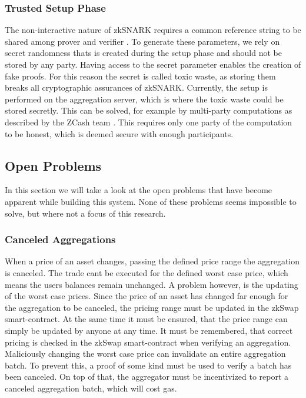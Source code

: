 \documentclass[../../thesis.tex]{subfiles}
\begin{document}
\subsubsection{Trusted Setup Phase} \label{setup}
The non-interactive nature of zkSNARK requires a common reference string to be shared among prover and verifier \cite{zcash_2019}. To generate these parameters, we rely on secret randomness thats is created during the setup phase and should not be stored by any party. Having access to the secret parameter enables the creation of fake proofs. For this reason the secret is called toxic waste, as storing them breaks all cryptographic assurances of zkSNARK. Currently, the setup is performed on the aggregation server, which is where the toxic waste could be stored secretly. This can be solved, for example by multi-party computations as described by the ZCash team \cite{zcash_2019}. This requires only one party of the computation to be honest, which is deemed secure with enough participants.

\subsection{Open Problems}
In this section we will take a look at the open problems that have become apparent while building this system. None of these problems seems impossible to solve, but where not a focus of this research. 

\subsubsection{Canceled Aggregations} \label{canceled_aggregation}
When a price of an asset changes, passing the defined price range the aggregation is canceled. The trade cant be executed for the defined worst case price, which means the users balances remain unchanged. A problem however, is the updating of the worst case prices. Since the price of an asset has changed far enough for the aggregation to be canceled, the pricing range must be updated in the zkSwap smart-contract. At the same time it must be ensured, that the price range can simply be updated by anyone at any time. It must be remembered, that correct pricing is checked in the zkSwap smart-contract when verifying an aggregation. Maliciously changing the worst case price can invalidate an entire aggregation batch. To prevent this, a proof of some kind must be used to verify a batch has been canceled. On top of that, the aggregator must be incentivized to report a canceled aggregation batch, which will cost gas.
\end{document}
